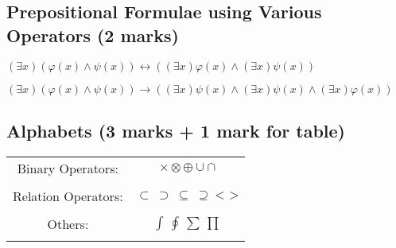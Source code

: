 \documentclass[11pt]{article}
\begin{document}
\subsection{Prepositional Formulae using Various Operators (2 marks)}
$ (\exists x)(\varphi (x) \wedge \psi (x)) \longleftrightarrow ((\exists x) \varphi (x) \wedge (\exists x) \psi (x)) $

$ (\exists x)(\varphi (x) \wedge \psi (x)) \longrightarrow ((\exists x)\psi (x) \wedge (\exists x) \psi (x) \wedge (\exists x)\varphi (x)) $

\subsection{Alphabets (3 marks + 1 mark for table)}
\begin{center}
\begin{tabular} { |c|c| }
 \hline
  Binary Operators: & $ \times \otimes \oplus \cup \cap $\\
  & \\
 \hline
  Relation Operators: & $ \subset \ \supset \ \subseteq \ \supseteq \ \textbf{< >} $ \\
  & \\
 \hline
  Others: & $ \int \ \oint \ \sum \ \prod $ \\
  & \\
 \hline
\end{tabular}
\end{center}
\end{document}
